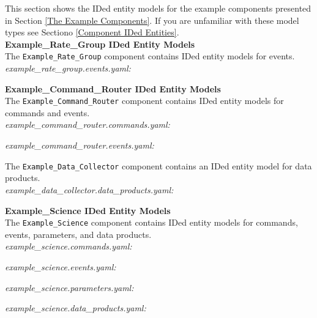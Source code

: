 This section shows the IDed entity models for the example components presented in Section \ref{The Example Components}. If you are unfamiliar with these model types see Sectiono \ref{Component IDed Entities}. \\

\textbf{Example\_Rate\_Group IDed Entity Models} \\

The \texttt{Example\_Rate\_Group} component contains IDed entity models for events. \\

\textit{example\_rate\_group.events.yaml:}

\textbf{Example\_Command\_Router IDed Entity Models} \\

The \texttt{Example\_Command\_Router} component contains IDed entity models for commands and events. \\

\textit{example\_command\_router.commands.yaml:}

\textit{example\_command\_router.events.yaml:}

The \texttt{Example\_Data\_Collector} component contains an IDed entity model for data products. \\

\textit{example\_data\_collector.data\_products.yaml:}

\textbf{Example\_Science IDed Entity Models} \\

The \texttt{Example\_Science} component contains IDed entity models for commands, events, parameters, and data products. \\

\textit{example\_science.commands.yaml:}

\textit{example\_science.events.yaml:}

\textit{example\_science.parameters.yaml:}

\textit{example\_science.data\_products.yaml:}

